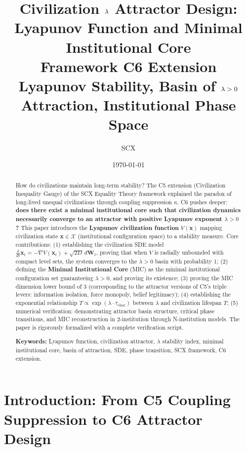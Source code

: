 \documentclass[12pt,a4paper]{article}
\title{
    {\Huge \textbf{Civilization $\lb$ Attractor Design: Lyapunov Function and Minimal Institutional Core}}\\[0.3cm]
    {\normalsize \SCX{} \eqtheory{} Framework \textperiodcentered{} C6 Extension}\\[0.2cm]
    {\normalsize Lyapunov Stability, Basin of $\lb>0$ Attraction, Institutional Phase Space}
}
\author{SCX}
\date{\today}
\theoremstyle{definition}
\newcommand{\SCX}{\textsf{SCX}}
\newcommand{\eqtheory}{Equality Theory}
\newcommand{\coupling}{\kappa}
\newcommand{\calX}{\mathcal{X}}
\newcommand{\lb}{\lambda}
\newcommand{\Lyap}{V}
\newcommand{\grad}{\nabla}
\newcommand{\ddt}{\frac{d}{dt}}
\begin{document}
\maketitle

\begin{abstract}
\noindent
How do civilizations maintain long-term stability? The C5 extension (Civilization Inequality Gauge) of the \SCX{} \eqtheory{} framework explained the paradox of long-lived unequal civilizations through coupling suppression $\coupling$. C6 pushes deeper: \textbf{does there exist a minimal institutional core such that civilization dynamics necessarily converge to an attractor with positive Lyapunov exponent $\lb>0$?} This paper introduces the \textbf{Lyapunov civilization function} $\Lyap(\mathbf{x})$ mapping civilization state $\mathbf{x} \in \calX$ (institutional configuration space) to a stability measure. Core contributions: (1) establishing the civilization SDE model $\ddt \mathbf{x}_t = -\grad \Lyap(\mathbf{x}_t) + \sqrt{2D}\,d\mathbf{W}_t$, proving that when $\Lyap$ is radially unbounded with compact level sets, the system converges to the $\lb>0$ basin with probability 1; (2) defining the \textbf{Minimal Institutional Core} (MIC) as the minimal institutional configuration set guaranteeing $\lb>0$, and proving its existence; (3) proving the MIC dimension lower bound of 3 (corresponding to the attractor versions of C5's triple levers: information isolation, force monopoly, belief legitimacy); (4) establishing the exponential relationship $T \propto \exp(\lb \cdot \tau_{\text{char}})$ between $\lb$ and civilization lifespan $T$; (5) numerical verification: demonstrating attractor basin structure, critical phase transitions, and MIC reconstruction in 2-institution through N-institution models. The paper is rigorously formalized with a complete verification script.

\vspace{0.3cm}
\noindent
\textbf{Keywords:} Lyapunov function, civilization attractor, $\lb$ stability index, minimal institutional core, basin of attraction, SDE, phase transition, SCX framework, C6 extension.
\end{abstract}

\newpage
\tableofcontents
\newpage

\section{Introduction: From C5 Coupling Suppression to C6 Attractor Design}
\label{sec:intro}
\end{document}

